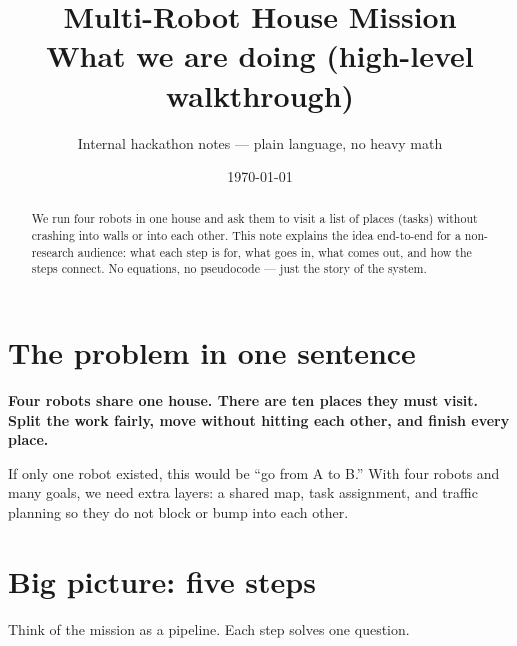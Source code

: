 \documentclass[11pt,a4paper]{article}
\title{\textbf{Multi-Robot House Mission}\\[0.3em]
\large What we are doing (high-level walkthrough)}
\author{Internal hackathon notes --- plain language, no heavy math}
\date{\today}
\begin{document}
\maketitle

\begin{abstract}
We run four robots in one house and ask them to visit a list of places
(tasks) without crashing into walls or into each other. This note explains
the idea end-to-end for a non-research audience: what each step is for, what
goes in, what comes out, and how the steps connect. No equations, no
pseudocode --- just the story of the system.
\end{abstract}

\tableofcontents
\newpage

\section{The problem in one sentence}

\textbf{Four robots share one house. There are ten places they must visit.
Split the work fairly, move without hitting each other, and finish every
place.}

If only one robot existed, this would be ``go from A to B.'' With four robots
and many goals, we need extra layers: a shared map, task assignment, and
traffic planning so they do not block or bump into each other.

\section{Big picture: five steps}

Think of the mission as a pipeline. Each step solves one question.
\end{document}
